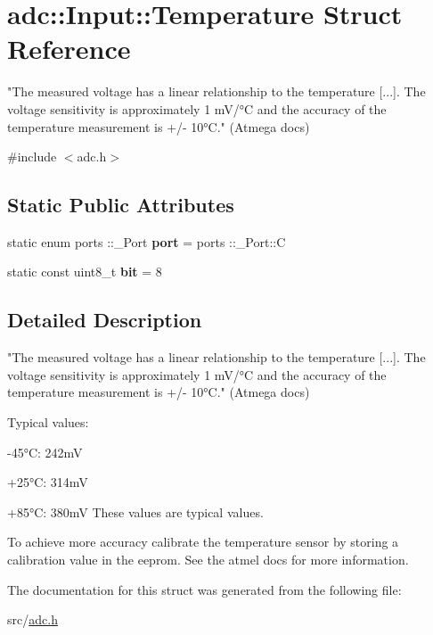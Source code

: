 \hypertarget{structadc_1_1Input_1_1Temperature}{}\section{adc\+:\+:Input\+:\+:Temperature Struct Reference}
\label{structadc_1_1Input_1_1Temperature}


"The measured voltage has a linear relationship to the temperature \mbox{[}...\mbox{]}. The voltage sensitivity is approximately 1 m\+V/°C and the accuracy of the temperature measurement is +/-\/ 10°C." (Atmega docs)  




{\ttfamily \#include $<$adc.\+h$>$}

\subsection*{Static Public Attributes}
\begin{DoxyCompactItemize}
\item 
\hypertarget{structadc_1_1Input_1_1Temperature_ac012a086a736256fccb6c33396289890}{}\label{structadc_1_1Input_1_1Temperature_ac012a086a736256fccb6c33396289890} 
static enum ports \+::\+\_\+\+Port {\bfseries port} = ports \+::\+\_\+\+Port\+::C
\item 
\hypertarget{structadc_1_1Input_1_1Temperature_aebcf8f7325e61063e68ffb71788054b9}{}\label{structadc_1_1Input_1_1Temperature_aebcf8f7325e61063e68ffb71788054b9} 
static const uint8\+\_\+t {\bfseries bit} = 8
\end{DoxyCompactItemize}


\subsection{Detailed Description}
"The measured voltage has a linear relationship to the temperature \mbox{[}...\mbox{]}. The voltage sensitivity is approximately 1 m\+V/°C and the accuracy of the temperature measurement is +/-\/ 10°C." (Atmega docs) 

Typical values\+:
\begin{DoxyItemize}
\item -\/45°C\+: 242mV
\item +25°C\+: 314mV
\item +85°C\+: 380mV These values are typical values.
\end{DoxyItemize}

To achieve more accuracy calibrate the temperature sensor by storing a calibration value in the eeprom. See the atmel docs for more information. 

The documentation for this struct was generated from the following file\+:\begin{DoxyCompactItemize}
\item 
src/\hyperlink{adc_8h}{adc.\+h}\end{DoxyCompactItemize}
